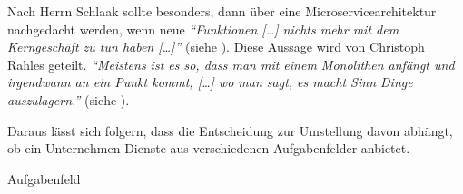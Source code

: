 Nach Herrn Schlaak sollte besonders, dann über eine Microservicearchitektur nachgedacht werden, wenn neue \textit{\enquote{Funktionen […] nichts mehr mit dem Kerngeschäft zu tun haben […]}} (siehe ). Diese Aussage wird von Christoph Rahles geteilt. \textit{\enquote{Meistens ist es so, dass man mit einem Monolithen anfängt und irgendwann an ein Punkt kommt, […] wo man sagt, es macht Sinn Dinge auszulagern.}} (siehe ).

Daraus lässt sich folgern, dass die Entscheidung zur Umstellung davon abhängt, ob ein Unternehmen Dienste aus verschiedenen Aufgabenfelder anbietet.

Aufgabenfeld

